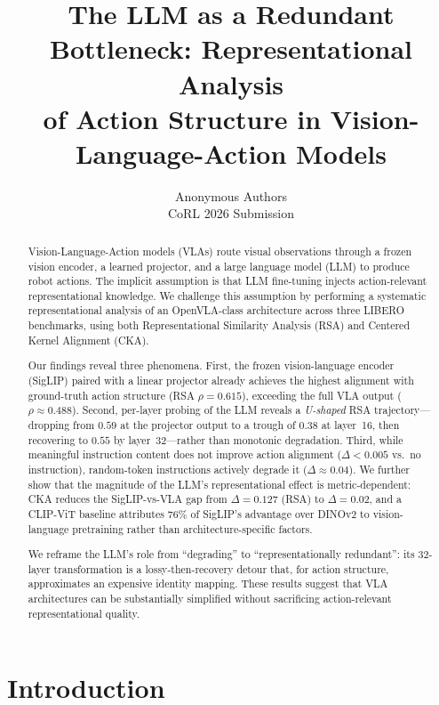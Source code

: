 \documentclass[letterpaper]{article}
\title{The LLM as a Redundant Bottleneck: Representational Analysis\\of Action Structure in Vision-Language-Action Models}
\author{
  Anonymous Authors\\
  CoRL 2026 Submission
}
\date{}
\begin{document}
\maketitle

\begin{abstract}
Vision-Language-Action models (VLAs) route visual observations through a frozen vision encoder, a learned projector, and a large language model (LLM) to produce robot actions.
The implicit assumption is that LLM fine-tuning injects action-relevant representational knowledge.
We challenge this assumption by performing a systematic representational analysis of an OpenVLA-class architecture across three LIBERO benchmarks, using both Representational Similarity Analysis (RSA) and Centered Kernel Alignment (CKA).

Our findings reveal three phenomena.
First, the frozen vision-language encoder (SigLIP) paired with a linear projector already achieves the highest alignment with ground-truth action structure (RSA $\rho=0.615$), exceeding the full VLA output ($\rho\approx0.488$).
Second, per-layer probing of the LLM reveals a \emph{U-shaped} RSA trajectory---dropping from $0.59$ at the projector output to a trough of $0.38$ at layer~16, then recovering to $0.55$ by layer~32---rather than monotonic degradation.
Third, while meaningful instruction content does not improve action alignment ($\Delta<0.005$ vs.\ no instruction), random-token instructions actively degrade it ($\Delta\approx0.04$).
We further show that the magnitude of the LLM's representational effect is metric-dependent: CKA reduces the SigLIP-vs-VLA gap from $\Delta=0.127$ (RSA) to $\Delta=0.02$, and a CLIP-ViT baseline attributes 76\% of SigLIP's advantage over DINOv2 to vision-language pretraining rather than architecture-specific factors.

We reframe the LLM's role from ``degrading'' to ``representationally redundant'': its 32-layer transformation is a lossy-then-recovery detour that, for action structure, approximates an expensive identity mapping.
These results suggest that VLA architectures can be substantially simplified without sacrificing action-relevant representational quality.
\end{abstract}

\section{Introduction}
\label{sec:intro}
\end{document}
